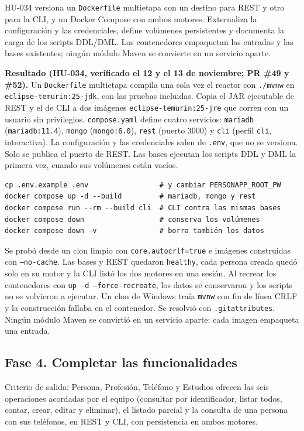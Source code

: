 \documentclass[11pt,a4paper]{article}
\begin{document}
HU-034 versiona un \texttt{Dockerfile} multietapa con un destino para REST y otro
para la CLI, y un Docker Compose con ambos motores. Externaliza la configuración y las credenciales, define volúmenes
persistentes y documenta la carga de los scripts DDL/DML. Los contenedores
empaquetan las entradas y las bases existentes; ningún módulo Maven se convierte
en un servicio aparte.

\textbf{Resultado (HU-034, verificado el 12 y el 13 de noviembre; PR \#49 y \#52).} Un
\texttt{Dockerfile} multietapa compila una sola vez el reactor con
\texttt{./mvnw} en \texttt{eclipse-temurin:25-jdk}, con las pruebas incluidas.
Copia el JAR ejecutable de REST y el de CLI a dos imágenes \texttt{eclipse-temurin:25-jre}
que corren con un usuario sin privilegios. \texttt{compose.yaml} define cuatro
servicios: \texttt{mariadb} (\texttt{mariadb:11.4}), \texttt{mongo}
(\texttt{mongo:6.0}), \texttt{rest} (puerto 3000) y \texttt{cli} (perfil
\texttt{cli}, interactiva). La configuración y las credenciales salen de
\texttt{.env}, que no se versiona. Solo se publica el puerto de REST. Las bases
ejecutan los scripts DDL y DML la primera vez, cuando sus volúmenes están vacíos.

\begin{verbatim}
cp .env.example .env                 # y cambiar PERSONAPP_ROOT_PW
docker compose up -d --build         # mariadb, mongo y rest
docker compose run --rm --build cli  # CLI contra las mismas bases
docker compose down                  # conserva los volúmenes
docker compose down -v               # borra también los datos
\end{verbatim}

Se probó desde un clon limpio con \texttt{core.autocrlf=true} e imágenes
construidas con \texttt{--no-cache}. Las bases y REST quedaron \texttt{healthy},
cada persona creada quedó solo en su motor y la CLI listó los dos motores en una
sesión. Al recrear los contenedores con \texttt{up -d --force-recreate}, los
datos se conservaron y los scripts no se volvieron a ejecutar. Un clon de
Windows traía \texttt{mvnw} con fin de línea CRLF y la construcción fallaba en el
contenedor. Se resolvió con \texttt{.gitattributes}. Ningún módulo Maven se
convirtió en un servicio aparte: cada imagen empaqueta una entrada.

\subsection{Fase 4. Completar las funcionalidades}
Criterio de salida: Persona, Profesión, Teléfono y Estudios ofrecen las seis
operaciones acordadas por el equipo (consultar por identificador, listar todos,
contar, crear, editar y eliminar), el listado parcial y la consulta de una
persona con sus teléfonos, en REST y CLI, con persistencia en ambos motores.
\end{document}
